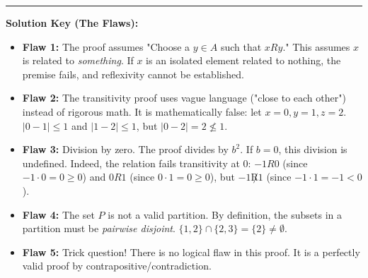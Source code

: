 \documentclass[11pt, a4paper]{article}
\theoremstyle{definition}
\theoremstyle{remark}
\begin{document}
\vspace{1em}
\hrule
\vspace{1em}
\textbf{Solution Key (The Flaws):}
\begin{itemize}
    \item \textbf{Flaw 1:} The proof assumes "Choose a $y \in A$ such that $x R y$." This assumes $x$ is related to \textit{something}. If $x$ is an isolated element related to nothing, the premise fails, and reflexivity cannot be established.
    \item \textbf{Flaw 2:} The transitivity proof uses vague language ("close to each other") instead of rigorous math. It is mathematically false: let $x=0, y=1, z=2$. $|0-1| \le 1$ and $|1-2| \le 1$, but $|0-2| = 2 \not\le 1$.
    \item \textbf{Flaw 3:} Division by zero. The proof divides by $b^2$. If $b = 0$, this division is undefined. Indeed, the relation fails transitivity at 0: $-1 R 0$ (since $-1 \cdot 0 = 0 \ge 0$) and $0 R 1$ (since $0 \cdot 1 = 0 \ge 0$), but $-1 \not R 1$ (since $-1 \cdot 1 = -1 < 0$).
    \item \textbf{Flaw 4:} The set $P$ is not a valid partition. By definition, the subsets in a partition must be \textit{pairwise disjoint}. $\{1, 2\} \cap \{2, 3\} = \{2\} \neq \emptyset$.
    \item \textbf{Flaw 5:} Trick question! There is no logical flaw in this proof. It is a perfectly valid proof by contrapositive/contradiction.
\end{itemize}
\end{document}

